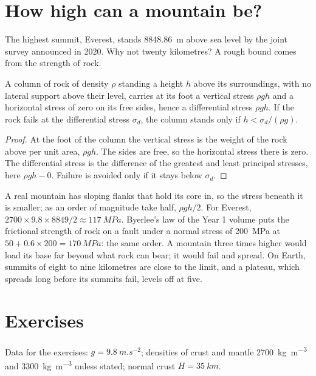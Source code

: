\section{How high can a mountain be?}\label{sec:b2:himalaya-andes:heights}

The highest summit, Everest, stands \qty{8848.86}{m} above sea level by the joint survey
announced in 2020. Why not twenty kilometres? A rough bound comes from the strength of rock.

\begin{proposition}\label{prop:b2:himalaya-andes:height}
A column of rock of density $\rho$ standing a height $h$ above its surroundings, with no
lateral support above their level, carries at its foot a vertical stress $\rho g h$ and a
horizontal stress of zero on its free sides, hence a differential stress $\rho g h$. If the
rock fails at the differential stress $\sigma_d$, the column stands only if $h < \sigma_d/(\rho
g)$.
\end{proposition}

\begin{proof}
At the foot of the column the vertical stress is the weight of the rock above per unit area,
$\rho g h$. The sides are free, so the horizontal stress there is zero. The differential
stress is the difference of the greatest and least principal stresses, here $\rho g h - 0$.
Failure is avoided only if it stays below $\sigma_d$.
\end{proof}

A real mountain has sloping flanks that hold its core in, so the stress beneath it is
smaller; as an order of magnitude take half, $\rho g h/2$. For Everest, $2700 \times 9.8
\times 8849/2 \approx \qty{117}{MPa}$. Byerlee's law of the Year 1 volume puts the frictional
strength of rock on a fault under a normal stress of \qty{200}{MPa} at $50 + 0.6 \times 200 =
\qty{170}{MPa}$: the same order. A mountain three times higher would load its base far beyond
what rock can bear; it would fail and spread. On Earth, summits of eight to nine kilometres
are close to the limit, and a plateau, which spreads long before its summits fail, levels off
at five.

\section*{Exercises}\label{sec:b2:himalaya-andes:exercises}

Data for the exercises: $g = \qty{9.8}{m.s^{-2}}$; densities of crust and mantle
\qty{2700}{kg.m^{-3}} and \qty{3300}{kg.m^{-3}} unless stated; normal crust $H =
\qty{35}{km}$.

